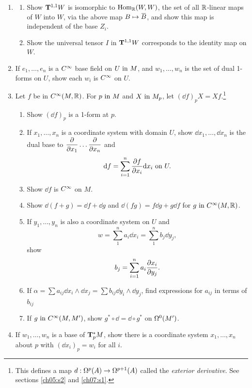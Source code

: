 \documentclass[../main]{subfiles}
\begin{document}
\begin{enumerate}
    \item\label{pro:36} 
    \begin{enumerate}[label=(\roman*)]
        \item Show $\tensorbundle{W}{1}{1}$ is isomorphic to $\Hom_\bR(W,W)$, the set of all $\bR$-linear maps of $W$ into $W$, via the above map $B \mapsto \xoverline B$, and show this map is independent of the base $Z_i$.
        \item Show the universal tensor $I$ in $\tensorbundle{W}{1}{1}$ corresponds to the identity map on $W$. 
    \end{enumerate}
    
    \item\label{pro:37} If $e_1,\dots,e_n$ is a $\CInfty$ base field on $U \InText M$, and $w_1, \dots, w_n$ is the set of dual 1-forms on $U$, show each $w_i$ is $\CInfty$ on $U$. 
    
    \item\label{pro:38} Let $f$ be in $\CInfty(M,\bR)$. For $p\InText M$ and $X \InText M_p$, let $(\dd f)_p X = Xf$.\footnote{This defines a map $d : \formbundle{A}{p} \functionMaps \formbundle{A}{p+1}$ called the \emph{exterior derivative}. See sections \ref{ch05:s2} and \ref{ch07:s1}.}
    \begin{enumerate}[label = (\roman*)]
        \item Show $(\dd f)_p$ is a 1-form at $p$.
        \item If $x_1,\dots,x_n$ is a coordinate system with domain $U$, show $\dd x_1,\dots, \dd x_n$ is the dual base to $\pdv{}{x_1}\dots \pdv{}{x_n}$ and \[\dd f = \sum_{i=1}^n \pdv{f}{x_i}\dd x_i\text{ on }U.\]
        \item Show $\dd f$ is $\CInfty$ on $M$.
        \item Show $\dd(f+g) = \dd f + \dd g$ and $\dd (fg) = f\dd g + g\dd f$ for $g \InText \CInfty(M,\bR)$.
        \item If $y_1,\dots,y_n$ is also a coordinate system on $U$ and \[w = \sum_1^n a_i\dd x_i = \sum_1^n b_j \dd y_j,\] show \[b_j = \sum_{i=1}^n a_i\pdv{x_i}{y_j}.\]
        \item If $\alpha = \sum a_{ij} \dd x_i \wedge\dd x_j = \sum b_{ij} \dd y_i\wedge \dd y_j$, find expressions for $a_{ij}$ in terms of $b_{ij}$
        \item If $g \InText \CInfty(M, M')$, show $g^*\circ \dd = \dd \circ g^*$ on $\formbundle{M'}{0}$.
    \end{enumerate}
    
    
    \item\label{pro:39} If $w_1,\dots,w_n$ is a base of $\cotangentspace{M}{p}$, show there is a coordinate system $x_1,\dots,x_n$ about $p$ with $(\dd x_i)_p = w_i$ for all $i$. 
    

\end{enumerate}
\end{document}
